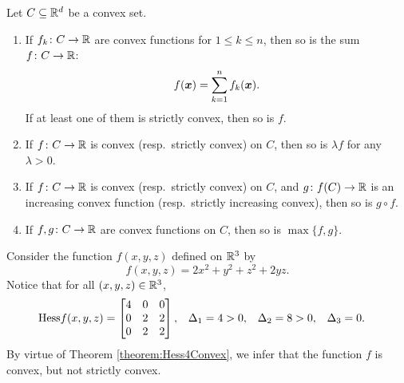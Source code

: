 \begin{theorem}\label{theorem:convexFunctionConvos}
Let $C \subseteq \mathbb{R}^d$ be a convex set.
\begin{enumerate}
	\item \label{theorem:convexFunctionConvo1} If $f_k \colon C \to \mathbb{R}$ are convex functions for $1\leq k \leq n$, then so is the sum $f \colon C \to \mathbb{R}$:
	\begin{equation*}
	f(\boldsymbol{x}) = \sum_{k=1}^n f_k(\boldsymbol{x}).
	\end{equation*}  
	If at least one of them is strictly convex, then so is $f$.
	\item \label{theorem:convexFunctionConvo2} If $f \colon C \to \mathbb{R}$ is convex (resp.~strictly convex) on $C$, then so is $\lambda f$ for any $\lambda > 0$.
	\item \label{theorem:convexFunctionConvo3} If $f \colon C \to \mathbb{R}$ is convex (resp.~strictly convex) on $C$, and $g\colon f(C) \to \mathbb{R}$ is an increasing convex function (resp.~strictly increasing convex), then so is $g\circ f$.
	\item \label{theorem:convexFunctionConvo4} If $f,g\colon C \to \mathbb{R}$ are convex functions on $C$, then so is $\max\{ f,g \}$.
\end{enumerate}
\end{theorem}

\begin{example}
Consider the function $f(x,y,z)$ defined on $\mathbb{R}^3$ by
\begin{equation*}
f(x,y,z) = 2x^2+y^2+z^2+2yz.
\end{equation*}
Notice that for all $(x,y,z) \in \mathbb{R}^3$,
\begin{align*}
\mathop{\mathrm{Hess}{f}}(x,y,z) &= \begin{bmatrix} 4 & 0 & 0 \\ 0 & 2 & 2 \\ 0 & 2 & 2 \end{bmatrix}, & \Delta_1 &= 4 > 0, &\Delta_2 &=8 > 0, &\Delta_3 &=0.
\end{align*}
By virtue of Theorem \ref{theorem:Hess4Convex}, we infer that the function $f$ is convex, but not strictly convex.
\end{example}

